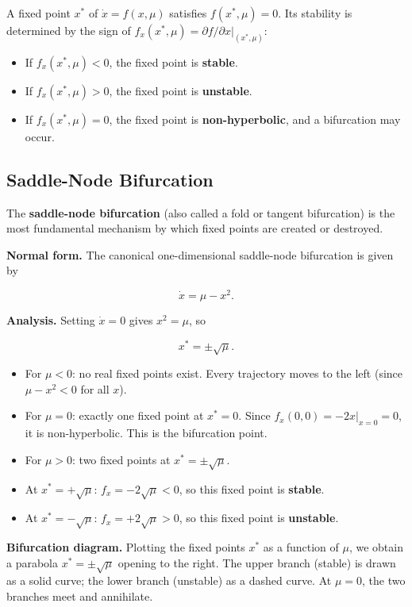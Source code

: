 A fixed point $x^*$ of $\dot{x} = f(x, \mu)$ satisfies $f(x^*, \mu) = 0$. Its stability is determined by the sign of $f_x(x^*, \mu) = \partial f / \partial x |_{(x^*, \mu)}$:

\begin{itemize}[nosep]
  \item If $f_x(x^*, \mu) < 0$, the fixed point is \textbf{stable}.
  \item If $f_x(x^*, \mu) > 0$, the fixed point is \textbf{unstable}.
  \item If $f_x(x^*, \mu) = 0$, the fixed point is \textbf{non-hyperbolic}, and a bifurcation may occur.
\end{itemize}

\subsection{Saddle-Node Bifurcation}\label{sec:5.2.1}

The \textbf{saddle-node bifurcation} (also called a fold or tangent bifurcation) is the most fundamental mechanism by which fixed points are created or destroyed.

\textbf{Normal form.} The canonical one-dimensional saddle-node bifurcation is given by

\begin{equation}\label{eq:5.1}\tag{5.1}
\dot{x} = \mu - x^2.
\end{equation}

\textbf{Analysis.} Setting $\dot{x} = 0$ gives $x^2 = \mu$, so

\[
x^* = \pm\sqrt{\mu}.
\]

\begin{itemize}[nosep]
  \item For $\mu < 0$: no real fixed points exist. Every trajectory moves to the left (since $\mu - x^2 < 0$ for all $x$).
  \item For $\mu = 0$: exactly one fixed point at $x^* = 0$. Since $f_x(0, 0) = -2x|_{x=0} = 0$, it is non-hyperbolic. This is the bifurcation point.
  \item For $\mu > 0$: two fixed points at $x^* = \pm\sqrt{\mu}$.
  \item At $x^* = +\sqrt{\mu}$: $f_x = -2\sqrt{\mu} < 0$, so this fixed point is \textbf{stable}.
  \item At $x^* = -\sqrt{\mu}$: $f_x = +2\sqrt{\mu} > 0$, so this fixed point is \textbf{unstable}.
\end{itemize}

\textbf{Bifurcation diagram.} Plotting the fixed points $x^*$ as a function of $\mu$, we obtain a parabola $x^* = \pm\sqrt{\mu}$ opening to the right. The upper branch (stable) is drawn as a solid curve; the lower branch (unstable) as a dashed curve. At $\mu = 0$, the two branches meet and annihilate.


